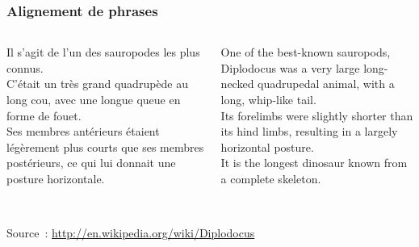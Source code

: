 \begin{frame}
\frametitle{Alignement de phrases}

\begin{columns}[c] 
    \small


    Il s'agit de l'un des sauropodes les plus connus. \\[0.5em]

    C'était un très grand quadrupède au long cou, avec une longue queue en 
    forme de fouet.\\[0.5em]

    Ses membres antérieurs étaient légèrement plus courts que ses membres 
    postérieurs, ce qui lui donnait une posture horizontale.\\[1.2em]
    ~


    \vspace*{1em}


    One of the best-known sauropods, Diplodocus was a very large long-necked 
    quadrupedal animal, with a long, whip-like tail.\\[1.2em]

    Its forelimbs were slightly shorter than its hind limbs, resulting in a 
    largely horizontal posture.\\[1.2em]

    It is the longest dinosaur known from a complete skeleton.

\end{columns}

\vspace*{1em}

Source~: \url{http://en.wikipedia.org/wiki/Diplodocus}

\end{frame}



